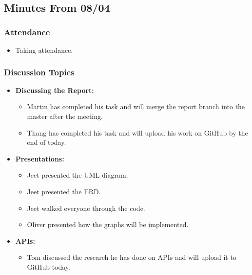 \documentclass[11pt]{article}
\begin{document}
\hypertarget{minutes-from-0804}{%
\subsection{Minutes From 08/04}\label{minutes-from-0804}}

\hypertarget{attendance-2}{%
\subsubsection{Attendance}\label{attendance-2}}

\begin{itemize}
\tightlist
\item
  Taking attendance.
\end{itemize}

\hypertarget{discussion-topics-1}{%
\subsubsection{Discussion Topics}\label{discussion-topics-1}}

\begin{itemize}
\tightlist
\item
  \textbf{Discussing the Report:}

  \begin{itemize}
  \tightlist
  \item
    Martin has completed his task and will merge the report branch into
    the master after the meeting.
  \item
    Thang has completed his task and will upload his work on GitHub by
    the end of today.
  \end{itemize}
\item
  \textbf{Presentations:}

  \begin{itemize}
  \tightlist
  \item
    Jeet presented the UML diagram.
  \item
    Jeet presented the ERD.
  \item
    Jeet walked everyone through the code.
  \item
    Oliver presented how the graphs will be implemented.
  \end{itemize}
\item
  \textbf{APIs:}

  \begin{itemize}
  \tightlist
  \item
    Tom discussed the research he has done on APIs and will upload it to
    GitHub today.
  \end{itemize}
\end{itemize}
\end{document}
